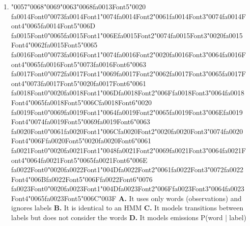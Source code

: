 \documentclass[11pt]{article}
\begin{document}
\begin{enumerate}[leftmargin=*]
  \item {\char"0057}{\char"0068}{\char"0069}{\char"0063}{\char"0068}{\csname fa0013Font5\endcsname\char"0020} {\csname fa0014Font0\endcsname\char"0073}{\csname fa0014Font1\endcsname\char"0074}{\csname fa0014Font2\endcsname\char"0061}{\csname fa0014Font3\endcsname\char"0074}{\csname fa0014Font4\endcsname\char"0065}{\csname fa0014Font5\endcsname\char"006D} {\csname fa0015Font0\endcsname\char"0065}{\csname fa0015Font1\endcsname\char"006E}{\csname fa0015Font2\endcsname\char"0074}{\csname fa0015Font3\endcsname\char"0020}{\csname fa0015Font4\endcsname\char"0062}{\csname fa0015Font5\endcsname\char"0065} {\csname fa0016Font0\endcsname\char"0073}{\csname fa0016Font1\endcsname\char"0074}{\csname fa0016Font2\endcsname\char"0020}{\csname fa0016Font3\endcsname\char"0064}{\csname fa0016Font4\endcsname\char"0065}{\csname fa0016Font5\endcsname\char"0073}{\csname fa0016Font6\endcsname\char"0063} {\csname fa0017Font0\endcsname\char"0072}{\csname fa0017Font1\endcsname\char"0069}{\csname fa0017Font2\endcsname\char"0062}{\csname fa0017Font3\endcsname\char"0065}{\csname fa0017Font4\endcsname\char"0073}{\csname fa0017Font5\endcsname\char"0020}{\csname fa0017Font6\endcsname\char"0061} {\csname fa0018Font0\endcsname\char"0020}{\csname fa0018Font1\endcsname\char"006D}{\csname fa0018Font2\endcsname\char"006F}{\csname fa0018Font3\endcsname\char"0064}{\csname fa0018Font4\endcsname\char"0065}{\csname fa0018Font5\endcsname\char"006C}{\csname fa0018Font6\endcsname\char"0020} {\csname fa0019Font0\endcsname\char"0069}{\csname fa0019Font1\endcsname\char"0064}{\csname fa0019Font2\endcsname\char"0065}{\csname fa0019Font3\endcsname\char"006E}{\csname fa0019Font4\endcsname\char"0074}{\csname fa0019Font5\endcsname\char"0069}{\csname fa0019Font6\endcsname\char"0063} {\csname fa0020Font0\endcsname\char"0061}{\csname fa0020Font1\endcsname\char"006C}{\csname fa0020Font2\endcsname\char"0020}{\csname fa0020Font3\endcsname\char"0074}{\csname fa0020Font4\endcsname\char"006F}{\csname fa0020Font5\endcsname\char"0020}{\csname fa0020Font6\endcsname\char"0061} {\csname fa0021Font0\endcsname\char"0020}{\csname fa0021Font1\endcsname\char"0048}{\csname fa0021Font2\endcsname\char"0069}{\csname fa0021Font3\endcsname\char"0064}{\csname fa0021Font4\endcsname\char"0064}{\csname fa0021Font5\endcsname\char"0065}{\csname fa0021Font6\endcsname\char"006E} {\csname fa0022Font0\endcsname\char"0020}{\csname fa0022Font1\endcsname\char"004D}{\csname fa0022Font2\endcsname\char"0061}{\csname fa0022Font3\endcsname\char"0072}{\csname fa0022Font4\endcsname\char"006B}{\csname fa0022Font5\endcsname\char"006F}{\csname fa0022Font6\endcsname\char"0076} {\csname fa0023Font0\endcsname\char"0020}{\csname fa0023Font1\endcsname\char"004D}{\csname fa0023Font2\endcsname\char"006F}{\csname fa0023Font3\endcsname\char"0064}{\csname fa0023Font4\endcsname\char"0065}{\csname fa0023Font5\endcsname\char"006C}{\char"003F}
    \textbf{A.} It uses only words (observations) and ignores labels
    \textbf{B.} It is identical to an HMM
    \textbf{C.} It models transitions between labels but does not consider the words
    \textbf{D.} It models emissions P(word | label)


\end{enumerate}
\end{document}
